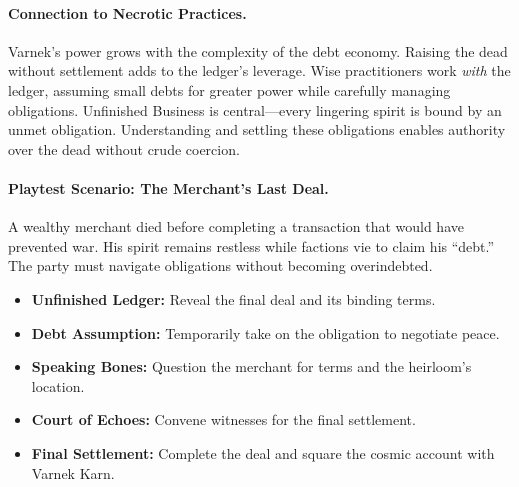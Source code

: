 \paragraph{Connection to Necrotic Practices.}
Varnek’s power grows with the complexity of the debt economy. Raising the dead without settlement adds to the ledger’s leverage. Wise practitioners work \emph{with} the ledger, assuming small debts for greater power while carefully managing obligations. Unfinished Business is central—every lingering spirit is bound by an unmet obligation. Understanding and settling these obligations enables authority over the dead without crude coercion.

\paragraph{Playtest Scenario: The Merchant’s Last Deal.}
A wealthy merchant died before completing a transaction that would have prevented war. His spirit remains restless while factions vie to claim his “debt.” The party must navigate obligations without becoming overindebted.  
\begin{itemize}
  \item \textbf{Unfinished Ledger:} Reveal the final deal and its binding terms.  
  \item \textbf{Debt Assumption:} Temporarily take on the obligation to negotiate peace.  
  \item \textbf{Speaking Bones:} Question the merchant for terms and the heirloom’s location.  
  \item \textbf{Court of Echoes:} Convene witnesses for the final settlement.  
  \item \textbf{Final Settlement:} Complete the deal and square the cosmic account with Varnek Karn.  
\end{itemize}
